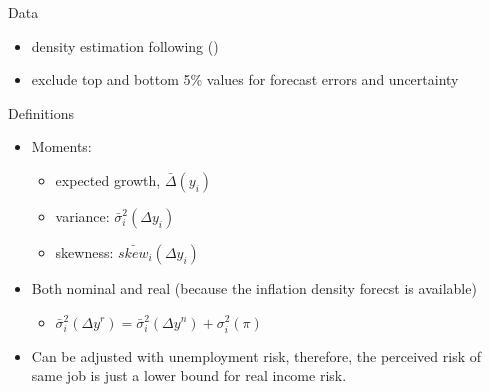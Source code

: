\documentclass{beamer}
\begin{document}
\begin{frame}{Data}
\begin{table}
	\centering
	\caption{Survey of Consumer Expectations}
	\label{SCE_data_sum}
	\end{table}
	\begin{itemize}
		\item density estimation following (\citet{engelberg_comparing_2009})
		\item exclude top and bottom 5\% values for forecast errors and uncertainty
	\end{itemize}
\end{frame}

\begin{frame}{Definitions}
	\begin{itemize}
		\item Moments:
		\begin{itemize}
			\item expected growth, $\bar \Delta (y_i)$
			\item variance: $\bar \sigma^2_i(\Delta y_i)$
			\item skewness: $\bar {skew}_i(\Delta y_i)$
		\end{itemize}
		\item Both nominal and real (because the inflation density forecst is available)
		\begin{itemize}
			\item $\bar \sigma_i^2(\Delta y^r) =\bar \sigma_i^2(\Delta y^n) +  \sigma_i^2(\pi)$  
		\end{itemize}
		\item Can be adjusted with unemployment risk, therefore, the perceived risk of same job is just a lower bound for real income risk. 
	\end{itemize}
\end{frame}
\end{document}
